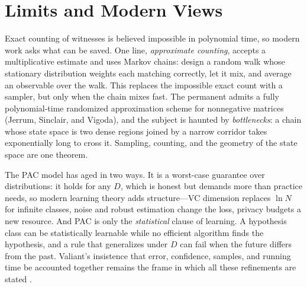 \section{Limits and Modern Views}
Exact counting of witnesses is believed impossible in polynomial time, so modern work asks what can be saved. One line, \emph{approximate counting}, accepts a multiplicative estimate and uses Markov chains: design a random walk whose stationary distribution weights each matching correctly, let it mix, and average an observable over the walk. This replaces the impossible exact count with a sampler, but only when the chain mixes fast. The permanent admits a fully polynomial-time randomized approximation scheme for nonnegative matrices (Jerrum, Sinclair, and Vigoda), and the subject is haunted by \emph{bottlenecks}: a chain whose state space is two dense regions joined by a narrow corridor takes exponentially long to cross it. Sampling, counting, and the geometry of the state space are one theorem.

The PAC model has aged in two ways. It is a worst-case guarantee over distributions: it holds for any \(D\), which is honest but demands more than practice needs, so modern learning theory adds structure---VC dimension replaces \(\ln N\) for infinite classes, noise and robust estimation change the loss, privacy budgets a new resource. And PAC is only the \emph{statistical} clause of learning. A hypothesis class can be statistically learnable while no efficient algorithm finds the hypothesis, and a rule that generalizes under \(D\) can fail when the future differs from the past. Valiant's insistence that error, confidence, samples, and running time be accounted together remains the frame in which all these refinements are stated \cite{valiant-counting,valiant-learning}.

